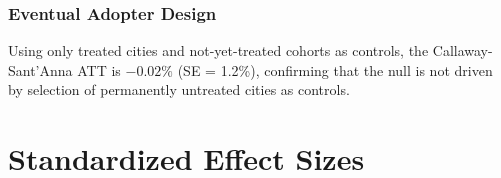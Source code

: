 \documentclass[12pt]{article}
\begin{document}
\subsubsection*{Eventual Adopter Design} Using only treated cities and not-yet-treated cohorts as controls, the Callaway-Sant'Anna ATT is $-0.02\%$ (SE = 1.2\%), confirming that the null is not driven by selection of permanently untreated cities as controls.


\section{Standardized Effect Sizes}
\label{sec:sde}


\end{document}
